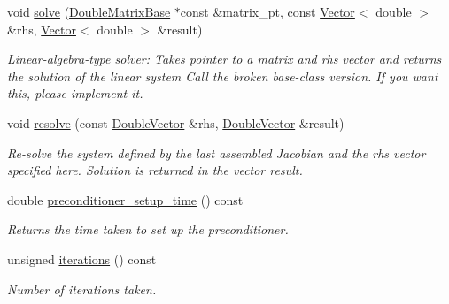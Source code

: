 \begin{DoxyCompactItemize}
void \hyperlink{classoomph_1_1GS_3_01CRDoubleMatrix_01_4_a989f4c09b2976a561acb498ba4d85ace}{solve} (\hyperlink{classoomph_1_1DoubleMatrixBase}{Double\+Matrix\+Base} $\ast$const \&matrix\+\_\+pt, const \hyperlink{classoomph_1_1Vector}{Vector}$<$ double $>$ \&rhs, \hyperlink{classoomph_1_1Vector}{Vector}$<$ double $>$ \&result)
\begin{DoxyCompactList}\small\item\em Linear-\/algebra-\/type solver\+: Takes pointer to a matrix and rhs vector and returns the solution of the linear system Call the broken base-\/class version. If you want this, please implement it. \end{DoxyCompactList}\item 
void \hyperlink{classoomph_1_1GS_3_01CRDoubleMatrix_01_4_ae03a5216cba7878a728bda9186be5d15}{resolve} (const \hyperlink{classoomph_1_1DoubleVector}{Double\+Vector} \&rhs, \hyperlink{classoomph_1_1DoubleVector}{Double\+Vector} \&result)
\begin{DoxyCompactList}\small\item\em Re-\/solve the system defined by the last assembled Jacobian and the rhs vector specified here. Solution is returned in the vector result. \end{DoxyCompactList}\item 
double \hyperlink{classoomph_1_1GS_3_01CRDoubleMatrix_01_4_af3ddbbec56c0ecc849b07bcec0c19bf4}{preconditioner\+\_\+setup\+\_\+time} () const
\begin{DoxyCompactList}\small\item\em Returns the time taken to set up the preconditioner. \end{DoxyCompactList}\item 
unsigned \hyperlink{classoomph_1_1GS_3_01CRDoubleMatrix_01_4_a0fe8a3e90df149b2ad6a247afe1adf2a}{iterations} () const
\begin{DoxyCompactList}\small\item\em Number of iterations taken. \end{DoxyCompactList}\end{DoxyCompactItemize}
